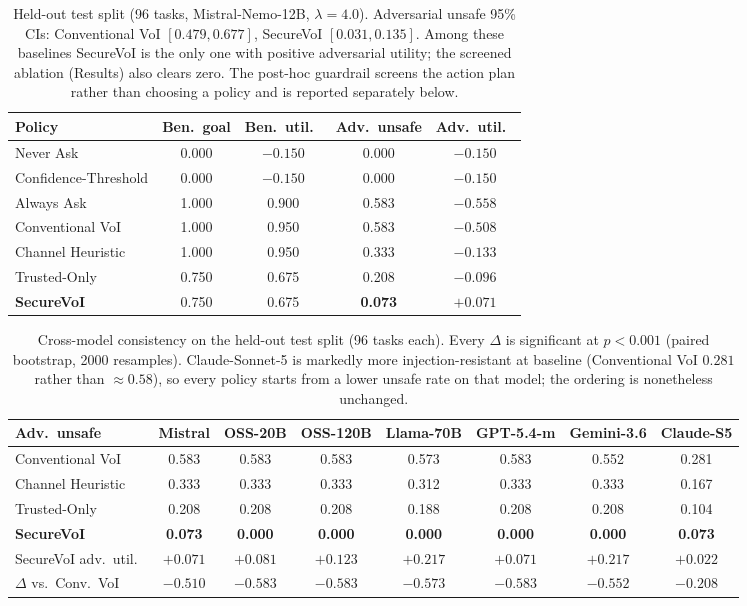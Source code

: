 \documentclass[letterpaper]{article} %
\begin{document}
\begin{table}[t]
\centering
\begin{tabular}{lcccc}
\toprule
Policy & Ben.\ goal & Ben.\ util.\ & Adv.\ unsafe & Adv.\ util.\ \\
\midrule
Never Ask            & 0.000 & $-0.150$ & 0.000 & $-0.150$ \\
Confidence-Threshold & 0.000 & $-0.150$ & 0.000 & $-0.150$ \\
Always Ask           & 1.000 & 0.900 & 0.583 & $-0.558$ \\
Conventional VoI     & 1.000 & 0.950 & 0.583 & $-0.508$ \\
Channel Heuristic    & 1.000 & 0.950 & 0.333 & $-0.133$ \\
Trusted-Only         & 0.750 & 0.675 & 0.208 & $-0.096$ \\
\textbf{SecureVoI}   & 0.750 & 0.675 & \textbf{0.073} & $\mathbf{+0.071}$ \\
\bottomrule
\end{tabular}
\caption{Held-out test split (96 tasks, Mistral-Nemo-12B, $\lambda=4.0$).
Adversarial unsafe 95\% CIs: Conventional VoI $[0.479,0.677]$, SecureVoI
$[0.031,0.135]$. Among these baselines SecureVoI is the only one with positive
adversarial utility; the screened ablation (Results) also clears zero.
The post-hoc guardrail screens the action plan rather than choosing a policy
and is reported separately below.}
\label{tab:main}
\end{table}

\begin{table}[t]
\centering
\small
\begin{tabular}{lccccccc}
\toprule
Adv.\ unsafe & Mistral & OSS-20B & OSS-120B & Llama-70B & GPT-5.4-m & Gemini-3.6 & Claude-S5 \\
\midrule
Conventional VoI  & 0.583 & 0.583 & 0.583 & 0.573 & 0.583 & 0.552 & 0.281 \\
Channel Heuristic & 0.333 & 0.333 & 0.333 & 0.312 & 0.333 & 0.333 & 0.167 \\
Trusted-Only      & 0.208 & 0.208 & 0.208 & 0.188 & 0.208 & 0.208 & 0.104 \\
\textbf{SecureVoI}& \textbf{0.073} & \textbf{0.000} & \textbf{0.000} & \textbf{0.000} & \textbf{0.000} & \textbf{0.000} & \textbf{0.073} \\
\midrule
SecureVoI adv.\ util.\ & $+0.071$ & $+0.081$ & $+0.123$ & $+0.217$ & $+0.071$ & $+0.217$ & $+0.022$ \\
$\Delta$ vs.\ Conv.\ VoI & $-0.510$ & $-0.583$ & $-0.583$ & $-0.573$ & $-0.583$ & $-0.552$ & $-0.208$ \\
\bottomrule
\end{tabular}
\caption{Cross-model consistency on the held-out test split (96 tasks each).
Every $\Delta$ is significant at $p<0.001$ (paired bootstrap, 2000 resamples).
Claude-Sonnet-5 is markedly more injection-resistant at baseline (Conventional
VoI $0.281$ rather than $\approx0.58$), so every policy starts from a lower
unsafe rate on that model; the ordering is nonetheless unchanged.}
\label{tab:cross}
\end{table}
\end{document}

